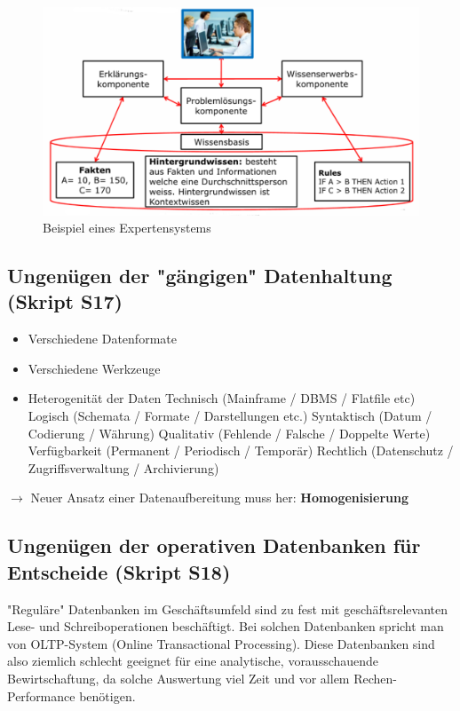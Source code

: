 \documentclass[a4paper, 11pt, nofootinbib]{article}
\begin{document}
\begin{figure}[htb]
	\centering
	\includegraphics[keepaspectratio=true,height=15\baselineskip]{expertensystem.png}
	\caption{Beispiel eines Expertensystems}
	\label{fig:xps}
\end{figure}

\newpage

\subsection{Ungenügen der "gängigen" Datenhaltung (Skript S17)}

\begin{itemize}
	\item Verschiedene Datenformate
	\item Verschiedene Werkzeuge
	\item Heterogenität der Daten
		\subitem Technisch (Mainframe / DBMS / Flatfile etc)
		\subitem Logisch (Schemata / Formate / Darstellungen etc.)
		\subitem Syntaktisch (Datum / Codierung / Währung)
		\subitem Qualitativ (Fehlende / Falsche / Doppelte Werte)
		\subitem Verfügbarkeit (Permanent / Periodisch / Temporär)
		\subitem Rechtlich (Datenschutz / Zugriffsverwaltung / Archivierung)
\end{itemize}

$\longrightarrow$ Neuer Ansatz einer Datenaufbereitung muss her: \textbf{Homogenisierung}

\subsection{Ungenügen der operativen Datenbanken für Entscheide (Skript S18)}

"Reguläre" Datenbanken im Geschäftsumfeld sind zu fest mit geschäftsrelevanten Lese- und Schreiboperationen beschäftigt. Bei solchen Datenbanken spricht man von OLTP-System (Online Transactional Processing). Diese Datenbanken sind also ziemlich schlecht geeignet für eine analytische, vorausschauende Bewirtschaftung, da solche Auswertung viel Zeit und vor allem Rechen-Performance benötigen.
\end{document}
